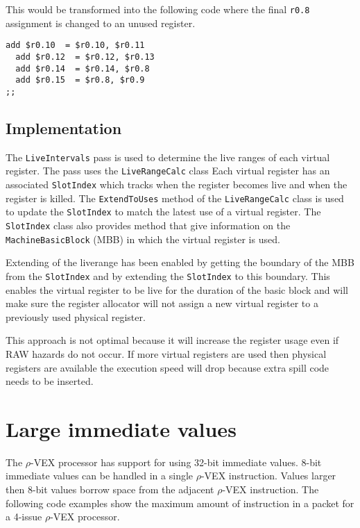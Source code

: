 This would be transformed into the following code where the final \texttt{r0.8} assignment is changed to an unused register. 

\begin{lstlisting}[language=rvex]
  add $r0.10  = $r0.10, $r0.11
  add $r0.12  = $r0.12, $r0.13
  add $r0.14  = $r0.14, $r0.8
  add $r0.15  = $r0.8, $r0.9
;;
\end{lstlisting}

\subsection{Implementation} %
\label{sub:implementation}
The \texttt{LiveIntervals} pass is used to determine the live ranges of each virtual register. The pass uses the \texttt{LiveRangeCalc} class
Each virtual register has an associated \texttt{SlotIndex} which tracks when the register becomes live and when the register is killed. The \texttt{ExtendToUses} method of the \texttt{LiveRangeCalc} class is used to update the \texttt{SlotIndex} to match the latest use of a virtual register. The \texttt{SlotIndex} class also provides method that give information on the \texttt{MachineBasicBlock} (MBB) in which the virtual register is used.

Extending of the liverange has been enabled by getting the boundary of the MBB from the \texttt{SlotIndex} and by extending the \texttt{SlotIndex} to this boundary. This enables the virtual register to be live for the duration of the basic block and will make sure the register allocator will not assign a new virtual register to a previously used physical register.

This approach is not optimal because it will increase the register usage even if RAW hazards do not occur. If more virtual registers are used then physical registers are available the execution speed will drop because extra spill code needs to be inserted.

\section{Large immediate values}
The $\rho$-VEX processor has support for using 32-bit immediate values. 8-bit immediate values can be handled in a single $\rho$-VEX instruction. Values larger then 8-bit values borrow space from the adjacent $\rho$-VEX instruction. The following code examples show the maximum amount of instruction in a packet for a 4-issue $\rho$-VEX processor.

